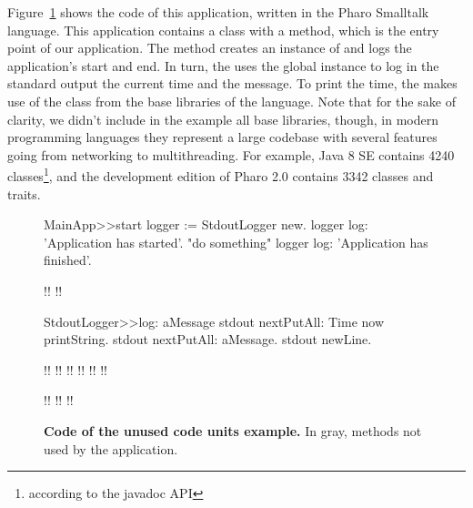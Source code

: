 Figure~\ref{fig:code_example1} shows the code of this application, written in the Pharo Smalltalk language. This application contains a  class with a  method, which is the entry point of our application. The  method creates an instance of  and logs the application's start and end. In turn, the  uses the  global instance to log in the standard output the current time and the message. To print the time, the  makes use of the  class from the base libraries of the language. Note that for the sake of clarity, we didn't include in the example all base libraries, though, in modern programming languages they represent a large codebase with several features going from networking to multithreading. For example, Java 8 SE contains 4240 classes\footnote{according to the javadoc API}, and the development edition of Pharo 2.0 contains 3342 classes and traits.

\begin{figure}[ht]
\begin{code}
MainApp>>start
    logger := StdoutLogger new.
    logger log: 'Application has started'.
    "do something"
    logger log: 'Application has finished'.

!!
!!

StdoutLogger>>log: aMessage
    stdout nextPutAll: Time now printString.
    stdout nextPutAll: aMessage.
    stdout newLine.
    
!!
!!
!!
!!
!!
!!

!!
!!
!!
\end{code}

\caption{ \small\textbf{Code of the unused code units example.} In gray, methods not used by the application.\label{fig:code_example1}}
\end{figure}

